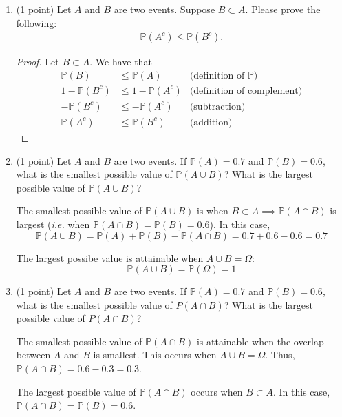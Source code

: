 \documentclass[11pt]{article}
\newcommand{\p}{\mathbb{P}}
\begin{document}
\begin{enumerate}
\item (1 point) Let $A$ and $B$ are two events. Suppose $B\subset A$. Please prove the following:
\begin{align*}
\mathbb{P}(A^c) \le \mathbb{P}(B^c).
\end{align*}

\begin{proof}
  Let \(B\subset A\). We have that
  \begin{align*}
    \p(B)&\leq\p(A) & \text{(definition of \(\p\))}\\
    1-\p(B^c)&\leq 1-\p(A^c) & \text{(definition of complement)}\\
    -\p(B^c)&\leq -\p(A^c) & \text{(subtraction)}\\
    \p(A^c)&\leq\p(B^c) & \text{(addition)}
  \end{align*}
\end{proof}

\item (1 point) Let $A$ and $B$ are two events. If $\mathbb{P}(A) = 0.7$ and $\mathbb{P}(B)=0.6$,  what is the smallest possible value of $\mathbb{P}(A\cup B)$? What is the largest possible value of $\mathbb{P}(A\cup B)$? 

The smallest possible value of \(\p(A\cup B)\) is when \(B\subset A\implies \p(A\cap B)\) is largest (\emph{i.e.} when \(\p(A\cap B)=\p(B)=0.6\)). In this case,
\[\p(A\cup B)=\p(A)+\p(B)-\p(A\cap B)=0.7 + 0.6 - 0.6 = 0.7\]

The largest possibe value is attainable when \(A\cup B=\Omega\):
\[\p(A\cup B)=\p(\Omega)=1\]

\item (1 point) Let $A$ and $B$ are two events. If $\mathbb{P}(A) = 0.7$ and $\mathbb{P}(B)=0.6$, what is the smallest possible value of $P(A\cap B)$? What is the largest possible value of $P(A\cap B)$? 

The smallest possible value of \(\p(A\cap B)\) is attainable when the overlap between \(A\) and \(B\) is smallest.
This occurs when \(A\cup B=\Omega\). Thus, \(\p(A\cap B)=0.6-0.3=0.3\).

The largest possible value of \(\p(A\cap B)\) occurs when \(B\subset A\). In this case, \(\p(A\cap B)=\p(B)=0.6\).

\end{enumerate}
\end{document}
